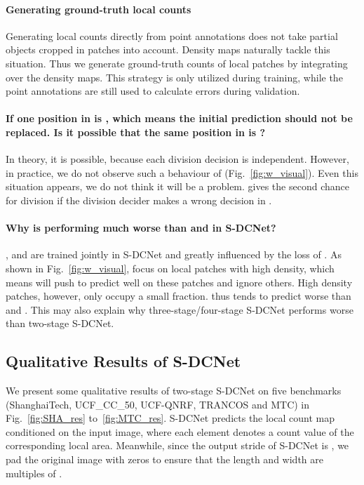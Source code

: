 \documentclass[10pt,twocolumn,letterpaper]{article}
\begin{document}
\paragraph{Generating ground-truth local counts}
Generating local counts directly from point annotations does not take partial objects cropped in patches into account. Density maps naturally tackle this situation. Thus we generate ground-truth counts of local patches by integrating over the density maps. This strategy is only utilized during training, while the point annotations are still used to calculate errors during validation.
\paragraph{If one position in  is , which means the initial prediction should not be replaced. Is it possible that the same position in  is ?}
In theory, it is possible, because each division decision is independent. However, in practice, we do not observe such a behaviour of  (Fig.~\ref{fig:w_visual}). Even this situation appears, we do not think it will be a problem.  gives the second chance for division if the division decider makes a wrong decision in .
\paragraph{Why  is performing much worse than  and  in S-DCNet?}
,  and  are trained jointly in S-DCNet and greatly influenced by the loss of . As shown in Fig.~\ref{fig:w_visual},  focus on local patches with high density, which means  will push  to predict well on these patches and ignore others. High density patches, however, only occupy a small fraction.  thus tends to predict worse than  and . This may also explain why three-stage/four-stage S-DCNet performs worse than two-stage S-DCNet.

\subsection{Qualitative Results of S-DCNet}
We present some qualitative results of two-stage S-DCNet on five benchmarks (ShanghaiTech, UCF\_CC\_50, UCF-QNRF, TRANCOS and MTC) in Fig.~\ref{fig:SHA_res} to~\ref{fig:MTC_res}. S-DCNet predicts the local count map conditioned on the input image, where each element denotes a count value of the corresponding  local area. Meanwhile, since the output stride of S-DCNet is , we pad the original image with zeros to ensure that the length and width are multiples of . 
\end{document}
